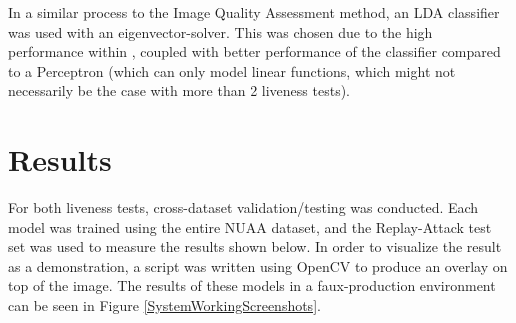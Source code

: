 \documentclass[12pt,a4paper]{article}
\begin{document}
        In a similar process to the Image Quality Assessment method, an LDA classifier was used with an eigenvector-solver. This was chosen due to the high performance within \cite{ImageQualityAssessmentTest},
        coupled with better performance of the classifier compared to a Perceptron (which can only model linear functions, which might not necessarily be the case with more than 2 liveness tests).
  
\section{Results}
    For both liveness tests, cross-dataset validation/testing was conducted. Each model was trained using the entire NUAA dataset, and the Replay-Attack test set
    was used to measure the results shown below. In order to visualize the result as a demonstration, a script was written using OpenCV to produce an overlay on top of the image.
    The results of these models in a faux-production environment can be seen in Figure \ref{SystemWorkingScreenshots}. 
    \setlength{\tabcolsep}{2pt}
\end{document}
